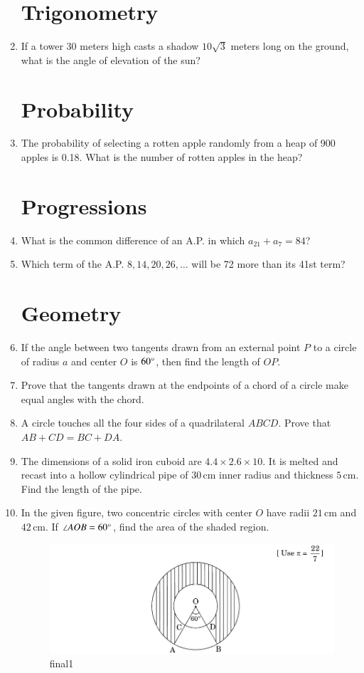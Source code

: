 \documentclass[12pt, letterpaper]{article}
\begin{document}
\begin{enumerate}
    \section*{Trigonometry}
    \item If a tower $30$ meters high casts a shadow $10\sqrt{3}$ meters long on the ground, what is the angle of elevation of the sun?

    \section*{Probability}
    \item The probability of selecting a rotten apple randomly from a heap of 900 apples is 0.18. What is the number of rotten apples in the heap?

    \section*{Progressions}
    \item What is the common difference of an A.P. in which $a_{21} + a_{7} = 84$?
    \item Which term of the A.P. $8, 14, 20, 26, \ldots$ will be 72 more than its 41st term?

    \section*{Geometry}
    \item If the angle between two tangents drawn from an external point $P$ to a circle of radius $a$ and center $O$ is $60\degree$, then find the length of $OP$.
    \item Prove that the tangents drawn at the endpoints of a chord of a circle make equal angles with the chord.
    \item A circle touches all the four sides of a quadrilateral $ABCD$. Prove that $AB + CD = BC + DA$.
    \item The dimensions of a solid iron cuboid are $4.4 \times 2.6 \times 10$. It is melted and recast into a hollow cylindrical pipe of $30\,\text{cm}$ inner radius and thickness $5\,\text{cm}$. Find the length of the pipe.
    \item In the given figure, two concentric circles with center $O$ have radii $21\,\text{cm}$ and $42\,\text{cm}$. If $\angle AOB = 60\degree$, find the area of the shaded region.

    \begin{figure}[H]
        \centering
        \includegraphics[width=\columnwidth]{final1.jpg}
	    \caption{final1}
    \end{figure}


\end{enumerate}
\end{document}
